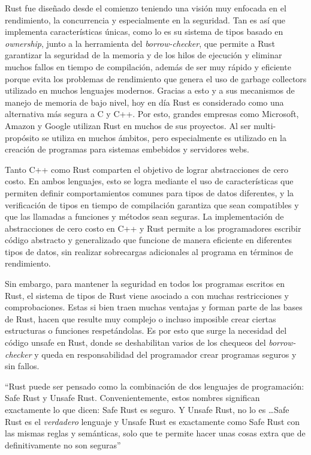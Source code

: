 Rust fue diseñado desde el comienzo teniendo una visión muy enfocada en el rendimiento, la concurrencia y especialmente en la seguridad. Tan es así que implementa características únicas, como lo es su sistema de tipos basado en \textit{ownership}, junto a la herramienta del \textit{borrow-checker}, que permite a Rust garantizar la seguridad de la memoria y de los hilos de ejecución y eliminar muchos fallos en tiempo de compilación, además de ser muy rápido y eficiente porque evita los problemas de rendimiento que genera el uso de garbage collectors utilizado en muchos lenguajes modernos. Gracias a esto y a sus mecanismos de manejo de memoria de bajo nivel, hoy en día Rust es considerado como una alternativa más segura a C y C++. Por esto, grandes empresas como Microsoft, Amazon y Google utilizan Rust en muchos de sus proyectos. Al ser multi-propósito se utiliza en muchos ámbitos, pero especialmente es utilizado en la creación de programas para sistemas embebidos y servidores webs.

Tanto C++ como Rust comparten el objetivo de lograr abstracciones de cero costo. En ambos lenguajes, esto se logra mediante el uso de características que permiten definir comportamientos comunes para tipos de datos diferentes, y la verificación de tipos en tiempo de compilación garantiza que sean compatibles y que las llamadas a funciones y métodos sean seguras. La implementación de abstracciones de cero costo en C++ y Rust permite a los programadores escribir código abstracto y generalizado que funcione de manera eficiente en diferentes tipos de datos, sin realizar sobrecargas adicionales al programa en términos de rendimiento.

Sin embargo, para mantener la seguridad en todos los programas escritos en Rust, el sistema de tipos de Rust viene asociado a con muchas restricciones y comprobaciones. Estas si bien traen muchas ventajas y forman parte de las bases de Rust, hacen que resulte muy complejo o incluso imposible crear ciertas estructuras o funciones respetándolas. Es por esto que surge la necesidad del código unsafe en Rust, donde se deshabilitan varios de los chequeos del \textit{borrow-checker} y queda en responsabilidad del programador crear programas seguros y sin fallos.

``Rust puede ser pensado como la combinación de dos lenguajes de programación: Safe Rust y Unsafe Rust. Convenientemente, estos nombres significan exactamente lo que dicen: Safe Rust es seguro. Y Unsafe Rust, no lo es \dots Safe Rust es el \textit{verdadero} lenguaje y Unsafe Rust es exactamente como Safe Rust con las mismas reglas y semánticas, solo que te permite hacer unas cosas extra que de definitivamente no son seguras'' \citep{rustonomicon}

